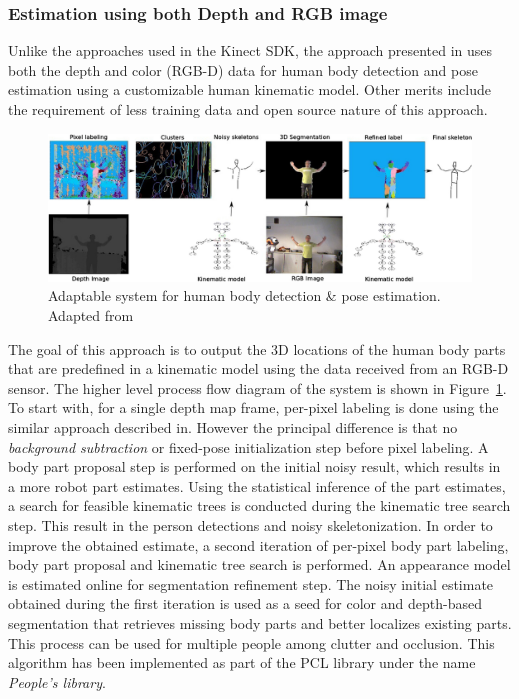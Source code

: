 \subsubsection{Estimation using both Depth and RGB image}
Unlike the approaches used in the Kinect SDK, the approach presented in \cite{buys2014adaptable} uses both the depth and color (RGB-D) data for human body detection and pose estimation using a customizable human kinematic model. Other merits include the requirement of less training data and open source nature of this approach. 
\begin{figure}[H]
\centering
\includegraphics[width=\textwidth]{assets/adaptable_system_rgbd.png}
\caption[Adaptable system for human body detection and pose estimation]{Adaptable system for human body detection \& pose estimation. {Adapted from \cite{buys2014adaptable}}}
\label{fig:adaptable_rgbd}
\end{figure}
The goal of this approach is to output the 3D locations of the human body parts that are predefined in a kinematic model using the data received from an RGB-D sensor. The higher level process flow diagram of the system is shown in Figure~\ref{fig:adaptable_rgbd}. To start with, for a single depth map frame, per-pixel labeling is done using the similar approach described in\cite{shotton2013real}. However the principal difference is that no \emph{background subtraction} or fixed-pose initialization step before pixel labeling. A body part proposal step is performed on the initial noisy result, which results in a more robot part estimates. Using the statistical inference of the part estimates, a search for feasible kinematic trees is conducted during the kinematic tree search step. This result in the person detections and noisy skeletonization. In order to improve the obtained estimate, a second iteration of per-pixel body part labeling, body part proposal and kinematic tree search is performed. An appearance model is estimated online for segmentation refinement step. The noisy initial estimate obtained during the first iteration is used as a seed for color and depth-based segmentation that retrieves missing body parts and better localizes existing parts. This process can be used for multiple people among clutter and occlusion. This algorithm has been implemented as part of the PCL\cite{rusu20113d} library under the name \emph{People's library}.

